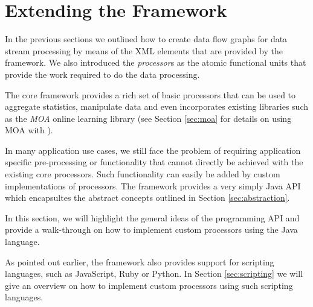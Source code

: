 \section{\label{sec:extendingStreams}Extending the \streams Framework}
In the previous sections we outlined how to create data flow graphs for
data stream processing by means of the XML elements that are provided
by the \streams framework. We also introduced the {\em processor}s as
the atomic functional units that provide the work required to do the
data processing.

The core \streams framework provides a rich set of basic processors that
can be used to aggregate statistics, manipulate data and even incorporates
existing libraries such as the {\em MOA} online learning library (see
Section \ref{sec:moa} for details on using MOA with \streams).

In many application use cases, we still face the problem of requiring
application specific pre-processing or functionality that cannot directly be 
achieved with the existing \streams core processors. Such functionality
can easily be added by custom implementations of processors. The \streams
framework provides a very simply Java API which encapsultes the abstract
concepts outlined in Section \ref{sec:abstraction}.

\medskip

In this section, we will highlight the general ideas of the \streams
programming API and provide a walk-through on how to implement custom
processors using the Java language. 

As pointed out earlier, the \streams framework also provides support
for scripting languages, such as JavaScript, Ruby or Python. In Section
\ref{sec:scripting} we will give an overview on how to implement custom
processors using such scripting languages.




